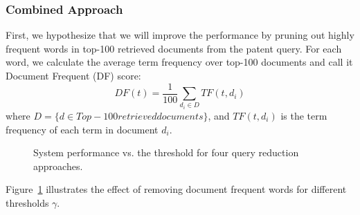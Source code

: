 \subsubsection{Combined Approach}
First, we hypothesize that we will improve the performance by pruning out highly frequent words in top-100 retrieved documents from the patent query. For each word, we calculate the average term frequency over top-100 documents and call it Document Frequent (DF) score:
\begin{equation}
 DF(t)=\frac{1}{100}\sum_{d_i\in  D} TF(t, d_i)    
 \label{eq:df}
\end{equation}
where $D=\{d\in Top-100 retrieved documents\}$, and $TF(t, d_i)$ is the term frequency of each term in document $d_i$.
\begin{figure}[t!]
\begin{centering}
 \hspace*{1.5cm}  
\par\end{centering} 
\protect\caption{System performance vs. the threshold for four query reduction approaches.}
\label{fig:combinedapproach}
\end{figure}
Figure~\ref{fig:combinedapproach} illustrates the effect of removing document frequent words for different thresholds $\gamma$.
